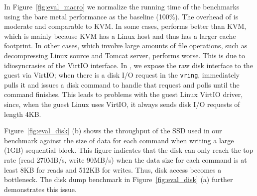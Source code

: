 In Figure~\ref{fig:eval_macro} we normalize the running time of the benchmarks
using the bare metal performance as the baseline (100\%). The overhead of
\mCTOShyper{} is moderate and comparable to KVM. In some cases, \mCTOShyper{}
performs better than KVM, which is mainly because KVM has a Linux host and thus has a
larger cache footprint. In other cases, which involve large amounts of file
operations, such as decompressing Linux source and Tomcat server, \mCTOShyper{}
performs worse. This is due to idiosyncrasies of the VirtIO interface. In
\mCTOShyper{}, we expose the raw disk interface to the guest via VirtIO; when
there is a disk I/O request in the \texttt{vring}, \mCTOShyper{} immediately
pulls it and issues a disk command to handle that request and polls until the
command finishes. This leads to problems with the guest Linux VirtIO driver, since,
when the guest Linux uses VirtIO, it always sends disk I/O requests of length
4KB.

Figure~\ref{fig:eval_disk} (b) shows the throughput of the SSD used in our
benchmark against the size of data for each command when writing a large (1GB)
sequential block. This figure indicates that the disk can only reach the top
rate (read 270MB/s, write 90MB/s) when the data size for each command is at
least 8KB for reads and 512KB for writes.
Thus, disk access becomes a bottleneck.
The disk dump benchmark in Figure~\ref{fig:eval_disk} (a)
further demonstrates this issue.

